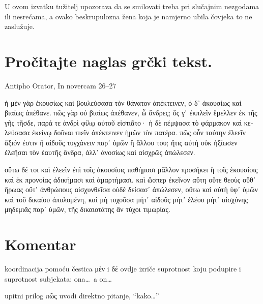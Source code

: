 U ovom izvatku tužitelj upozorava da se smilovati treba pri slučajnim nezgodama ili nesrećama, a ovako beskrupulozna žena koja je namjerno ubila čovjeka to ne zaslužuje.



\section*{Pročitajte naglas grčki tekst.}

Antipho Orator, In novercam 26–27


\medskip


{\large

\begin{greek}

\noindent ἡ μὲν γὰρ ἑκουσίως καὶ βουλεύσασα τὸν θάνατον ἀπέκτεινεν, ὁ δ᾽ ἀκουσίως καὶ βιαίως ἀπέθανε. πῶς γὰρ οὐ βιαίως ἀπέθανεν, ὦ ἄνδρες; ὅς γ᾽ ἐκπλεῖν ἔμελλεν ἐκ τῆς γῆς τῆσδε, παρά τε ἀνδρὶ φίλῳ αὑτοῦ εἱστιᾶτο· ἡ δὲ πέμψασα τὸ φάρμακον καὶ κελεύσασα ἐκείνῳ δοῦναι πιεῖν ἀπέκτεινεν ἡμῶν τὸν πατέρα. πῶς οὖν ταύτην ἐλεεῖν ἄξιόν ἐστιν ἢ αἰδοῦς τυγχάνειν παρ᾽ ὑμῶν ἢ ἄλλου του; ἥτις αὐτὴ οὐκ ἠξίωσεν ἐλεῆσαι τὸν ἑαυτῆς ἄνδρα, ἀλλ᾽ ἀνοσίως καὶ αἰσχρῶς ἀπώλεσεν.

οὕτω δέ τοι καὶ ἐλεεῖν ἐπὶ τοῖς ἀκουσίοις παθήμασι μᾶλλον προσήκει ἢ τοῖς ἑκουσίοις καὶ ἐκ προνοίας ἀδικήμασι καὶ ἁμαρτήμασι. καὶ ὥσπερ ἐκεῖνον αὕτη οὔτε θεοὺς οὔθ᾽ ἥρωας οὔτ᾽ ἀνθρώπους αἰσχυνθεῖσα οὐδὲ δείσασ᾽ ἀπώλεσεν, οὕτω καὶ αὐτὴ ὑφ᾽ ὑμῶν καὶ τοῦ δικαίου ἀπολομένη, καὶ μὴ τυχοῦσα μήτ᾽ αἰδοῦς μήτ᾽ ἐλέου μήτ᾽ αἰσχύνης μηδεμιᾶς παρ᾽ ὑμῶν, τῆς δικαιοτάτης ἂν τύχοι τιμωρίας.

\end{greek}

}


\section*{Komentar}


\begin{description}[noitemsep]
\item[ἡ μὲν… ὁ δ'] koordinacija pomoću čestica μὲν i δέ ovdje izriče suprotnost koju podupire i suprotnost subjekata: ona\dots\ a on\dots
\end{description}


\begin{description}[noitemsep]
\item[Πῶς… ἀπέθανεν] upitni prilog πῶς uvodi direktno pitanje, “kako…”
\end{description}

